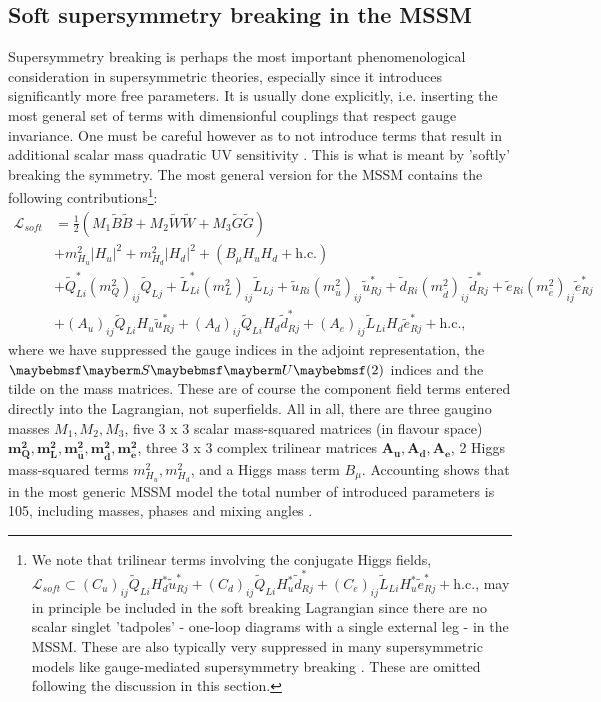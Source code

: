 \subsection{Soft supersymmetry breaking in the MSSM}
\label{subsec:MSSMsoftbreak}
Supersymmetry breaking is perhaps the most important phenomenological consideration in supersymmetric theories, especially since it introduces significantly more free parameters. It is usually done explicitly, i.e. inserting the most general set of terms with dimensionful couplings that respect gauge invariance. One must be careful however as to not introduce terms that result in additional scalar mass quadratic UV sensitivity \cite{RN555}. This is what is meant by 'softly' breaking the symmetry. The most general version for the MSSM contains the following contributions\footnote{\label{fn:Cmatrix}We note that trilinear terms involving the conjugate Higgs fields, $\mathcal{L}_{soft}\subset(C_u)_{ij}\tilde{Q}_{Li}H^{*}_{d}\tilde{u}^{*}_{Rj}+(C_d)_{ij}\tilde{Q}_{Li}H^{*}_{u}\tilde{d}^{*}_{Rj}+(C_e)_{ij}\tilde{L}_{Li}H^{*}_{u}\tilde{e}^{*}_{Rj}+\text{h.c.}$, may in principle be included in the soft breaking Lagrangian since there are no scalar singlet 'tadpoles' - one-loop diagrams with a single external leg - in the MSSM. These are also typically very suppressed in many supersymmetric models like gauge-mediated supersymmetry breaking \cite{RN526,RN520}. These are omitted following the discussion in this section.}:
{\small
\begin{align}
\mathcal{L}_{soft}&=\frac{1}{2}\left(M_{1}\tilde{B}\tilde{B}+M_{2}\tilde{W}\tilde{W}+M_{3}\tilde{G}\tilde{G}\right) \nonumber \\
&+m^{2}_{H_u}|H_u|^2+m^{2}_{H_d}|H_d|^2+\left(B_{\mu}H_{u}H_{d}+\text{h.c.}\right) \nonumber \\
&+\tilde{Q}^{*}_{Li}\left(m^{2}_{Q}\right)_{ij}\tilde{Q}_{Lj}
+\tilde{L}^{*}_{Li}\left(m^{2}_{L}\right)_{ij}\tilde{L}_{Lj}
+\tilde{u}_{Ri}\left(m^{2}_{\overline{u}}\right)_{ij}\tilde{u}^{*}_{Rj}
+\tilde{d}_{Ri}\left(m^{2}_{\overline{d}}\right)_{ij}\tilde{d}^{*}_{Rj}
+\tilde{e}_{Ri}\left(m^{2}_{\overline{e}}\right)_{ij}\tilde{e}^{*}_{Rj} \nonumber \\
&+(A_u)_{ij}\tilde{Q}_{Li}H_{u}\tilde{u}^{*}_{Rj}+(A_d)_{ij}\tilde{Q}_{Li}H_{d}\tilde{d}^{*}_{Rj}+(A_e)_{ij}\tilde{L}_{Li}H_{d}\tilde{e}^{*}_{Rj}+\text{h.c.},
\label{eqn:SUSYsoftbreak}
\end{align}}
where we have suppressed the gauge indices in the adjoint representation, the $\SUgroup{2}$ indices and the tilde on the mass matrices. These are of course the component field terms entered directly into the Lagrangian, not superfields. All in all, there are three gaugino masses $M_1,M_2,M_3$, five 3 x 3 scalar mass-squared matrices (in flavour space) $\mathbf{m^2_{Q}},\mathbf{m^2_{L}},\mathbf{m^2_{\overline{u}}},\mathbf{m^2_{\overline{d}}},\mathbf{m^2_{\overline{e}}}$, three 3 x 3 complex trilinear matrices $\mathbf{A_{u}},\mathbf{A_{d}},\mathbf{A_{e}}$, 2 Higgs mass-squared terms $m^2_{H_u},m^2_{H_d}$, and a Higgs mass term $B_{\mu}$. Accounting shows that in the most generic MSSM model the total number of introduced parameters is 105, including masses, phases and mixing angles \cite{RN556}. 

